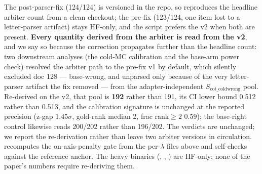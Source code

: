 The post-parser-fix  (124/124) is versioned in the
repo, so  reproduces the headline
arbiter count from a clean checkout; the pre-fix 
(123/124, one item lost to a letter-parser artifact) stays HF-only, and the script
prefers the v2 when both are present. \textbf{Every quantity derived from the
arbiter is read from the v2}, and we say so because the correction propagates
further than the headline count: two downstream analyses (the cold-MC calibration
and the base-arm power check) resolved the arbiter path to the pre-fix v1 by
default, which silently excluded doc 128 --- base-wrong, and unparsed only because
of the very letter-parser artifact the fix removed --- from the adapter-independent
$S_{\mathrm{cot\_coldwrong}}$ pool. Re-derived on the v2, that pool is \textbf{192}
rather than 191, its CI lower bound 0.512 rather than 0.513, and the calibration
signature is unchanged at the reported precision (z-gap $1.45\sigma$, gold-rank
median 2, frac rank${\geq}2$ 0.59); the base-right control likewise reads 200/202
rather than 196/202. The verdicts are unchanged; we report the re-derivation rather
than leave two arbiter versions in circulation.
 recomputes the on-axis-penalty gate from the
per-$\lambda$ files above and self-checks against the reference anchor. The heavy
binaries (,
,
) are HF-only; none of the
paper's numbers require re-deriving them.
